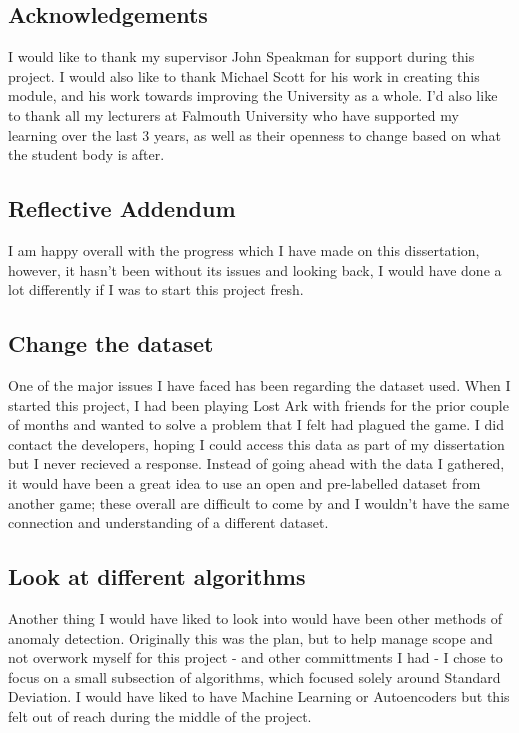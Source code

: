 \documentclass[journal]{IEEEtran}
\begin{document}
\printbibliography
\begin{appendices}
    \begin{appendices}
        \section{Acknowledgements}
        \label{appendix:aknowledgements}
        I would like to thank my supervisor John Speakman for support during this project. I would also like to thank Michael Scott for his work in creating this module, and his work towards improving the University as a whole. I'd also like to thank all my lecturers at Falmouth University who have supported my learning over the last 3 years, as well as their openness to change based on what the student body is after.
    \end{appendices}

    \begin{appendices}
        \section{Reflective Addendum}
        \label{appendix:reflection}
        I am happy overall with the progress which I have made on this dissertation, however, it hasn't been without its issues and looking back, I would have done a lot differently if I was to start this project fresh.

        \subsection{Change the dataset}
        One of the major issues I have faced has been regarding the dataset used. When I started this project, I had been playing Lost Ark with friends for the prior couple of months and wanted to solve a problem that I felt had plagued the game. I did contact the developers, hoping I could access this data as part of my dissertation but I never recieved a response. Instead of going ahead with the data I gathered, it would have been a great idea to use an open and pre-labelled dataset from another game; these overall are difficult to come by and I wouldn't have the same connection and understanding of a different dataset.

        \subsection{Look at different algorithms}
        Another thing I would have liked to look into would have been other methods of anomaly detection. Originally this was the plan, but to help manage scope and not overwork myself for this project - and other committments I had - I chose to focus on a small subsection of algorithms, which focused solely around Standard Deviation. I would have liked to have Machine Learning or Autoencoders but this felt out of reach during the middle of the project.


\end{appendices}
\end{appendices}
\end{document}
